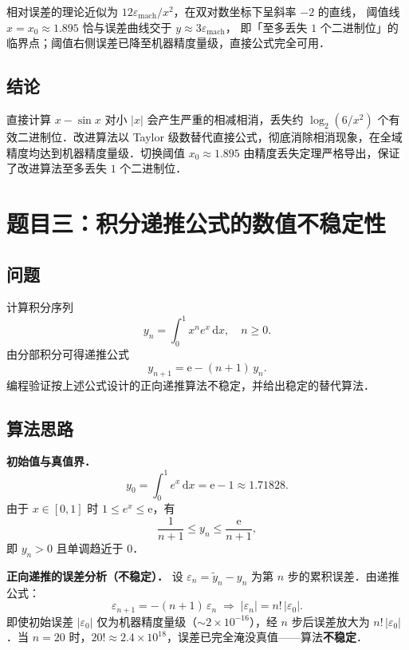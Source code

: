 \documentclass[UTF8,a4paper,11pt]{article}
\begin{document}
相对误差的理论近似为 $12\varepsilon_{\mathrm{mach}}/x^2$，在双对数坐标下呈斜率 $-2$ 的直线，
阈值线 $x = x_0 \approx 1.895$ 恰与误差曲线交于 $y \approx 3\varepsilon_{\mathrm{mach}}$，
即「至多丢失 $1$ 个二进制位」的临界点；阈值右侧误差已降至机器精度量级，直接公式完全可用．

\subsection{结论}

直接计算 $x - \sin x$ 对小 $|x|$ 会产生严重的相减相消，丢失约 $\log_2(6/x^2)$ 个有效二进制位．改进算法以 Taylor 级数替代直接公式，彻底消除相消现象，在全域精度均达到机器精度量级．切换阈值 $x_0 \approx 1.895$ 由精度丢失定理严格导出，保证了改进算法至多丢失 $1$ 个二进制位．

\clearpage

\section{题目三：积分递推公式的数值不稳定性}

\subsection{问题}

计算积分序列
$$y_n = \int_0^1 x^n e^x\,\mathrm{d}x, \quad n \ge 0.$$
由分部积分可得递推公式
$$y_{n+1} = \mathrm{e} - (n+1)\,y_n.$$
编程验证按上述公式设计的正向递推算法不稳定，并给出稳定的替代算法．

\subsection{算法思路}

\noindent\textbf{初始值与真值界．}
$$y_0 = \int_0^1 e^x\,\mathrm{d}x = \mathrm{e} - 1 \approx 1.71828.$$
由于 $x \in [0,1]$ 时 $1 \le e^x \le \mathrm{e}$，有
$$\frac{1}{n+1} \le y_n \le \frac{\mathrm{e}}{n+1},$$
即 $y_n > 0$ 且单调趋近于 $0$．

\noindent\textbf{正向递推的误差分析（不稳定）．}
设 $\varepsilon_n = \tilde{y}_n - y_n$ 为第 $n$ 步的累积误差．由递推公式：
$$\varepsilon_{n+1} = -(n+1)\,\varepsilon_n \;\Longrightarrow\; |\varepsilon_n| = n!\,|\varepsilon_0|.$$
即使初始误差 $|\varepsilon_0|$ 仅为机器精度量级（$\sim 2\times10^{-16}$），经 $n$ 步后误差放大为 $n!\,|\varepsilon_0|$．当 $n = 20$ 时，$20! \approx 2.4 \times 10^{18}$，误差已完全淹没真值——算法\textbf{不稳定}．
\end{document}
